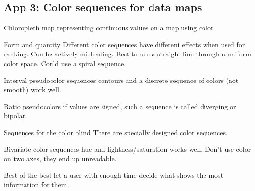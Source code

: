 \begin{mdframed}\begin{multicols}{2}
\subsection{App 3: Color sequences for data maps}
\begin{compactdesc}
    \item[Chloropleth map] representing continuous values on a map using color
    \item[Form and quantity] Different color sequences have different effects
        when used for ranking. Can be actively misleading. Best to use
        a straight line through a uniform color space. Could use a spiral
        sequence.
    \item[Interval pseudocolor sequences] contours and a discrete sequence
        of colors (not smooth) work well.
    \item[Ratio pseudocolors] if values are signed, such a sequence is called
        diverging or bipolar.
    \item[Sequences for the color blind] There are specially designed color
        sequences.
    \item[Bivariate color sequences] hue and lightness/saturation works well.
        Don't use color on two axes, they end up unreadable.
    \item[Best of the best] let a user with enough time decide what shows
        the most information for them.
\end{compactdesc}
\end{multicols}\end{mdframed}


